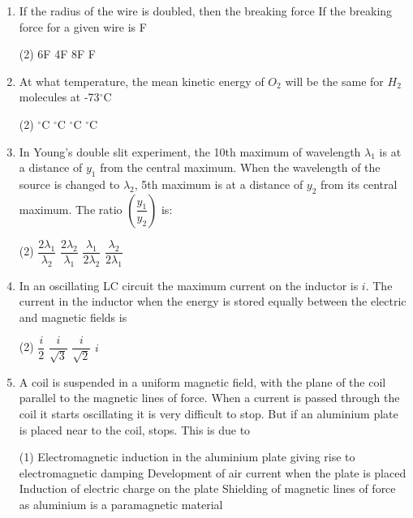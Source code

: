 \documentclass[twocolumn]{article}
\renewcommand{\frac}[2]{\dfrac{#1}{#2}}
\begin{document}
\begin{enumerate}
    \item If the radius of the wire is doubled, then the breaking force If the breaking force for a given wire is F
    \begin{tasks}(2)
        \task 6F
        \task 4F
        \task 8F
        \task F
    \end{tasks}

    \item At what temperature, the mean kinetic energy of $O_2$ will be the same for $H_2$ molecules at -73$^\circ$C
    \begin{tasks}(2)
        $^\circ$C
        $^\circ$C
        $^\circ$C
        $^\circ$C
    \end{tasks}

    \item In Young's double slit experiment, the 10th maximum of wavelength $\lambda_1$ is at a distance of $y_1$ from the central maximum. When the wavelength of the source is changed to $\lambda_2$, 5th maximum is at a distance of $y_2$ from its central maximum. The ratio $\left(\frac{y_1}{y_2}\right)$ is:
    \begin{tasks}(2)
        \task $\frac{2\lambda_1}{\lambda_2}$
        \task $\frac{2\lambda_2}{\lambda_1}$
        \task $\frac{\lambda_1}{2\lambda_2}$
        \task $\frac{\lambda_2}{2\lambda_1}$
    \end{tasks}

    \item In an oscillating LC circuit the maximum current on the inductor is \( i \). The current in the inductor when the energy is stored equally between the electric and magnetic fields is
    \begin{tasks}(2)
        \task \( \frac{i}{2} \)
        \task \( \frac{i}{\sqrt{3}} \)
        \task \( \frac{i}{\sqrt{2}} \)
        \task \( i \)
    \end{tasks}
    
    \item A coil is suspended in a uniform magnetic field, with the plane of the coil parallel to the magnetic lines of force. When a current is passed through the coil it starts oscillating it is very difficult to stop. But if an aluminium plate is placed near to the coil, stops. This is due to
    \begin{tasks}(1)
        \task Electromagnetic induction in the aluminium plate giving rise to electromagnetic damping
        \task Development of air current when the plate is placed
        \task Induction of electric charge on the plate
        \task Shielding of magnetic lines of force as aluminium is a paramagnetic material
    \end{tasks}
    

\end{enumerate}
\end{document}
